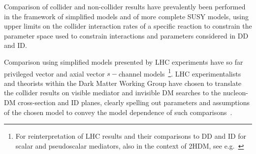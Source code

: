 
Comparison of collider and non-collider results have prevalently been performed in the framework of simplified models and of more complete SUSY models, using upper limits on the collider interaction rates of a specific reaction to constrain the parameter space used to constrain interactions and parameters considered in DD and ID. 

Comparison using simplified models presented by LHC experiments have so far privileged vector and axial vector $s-$channel models~\footnote{For reinterpretation of LHC results and their comparisons to DD and ID for scalar and pseudoscalar mediators, also in the context of 2HDM, see e.g.~\cite{Athron:2017kgt,Banerjee:2017wxi,Ipek:2014gua,Bell:2016ekl}}.
LHC experimentalists and theorists within the Dark Matter Working Group have chosen to translate the collider results on visible mediator and invisible DM searches to the nucleon-DM cross-section and ID planes, clearly spelling out parameters and assumptions of the chosen model to convey the model dependence of such comparisons~\cite{Boveia:2016mrp}. 


